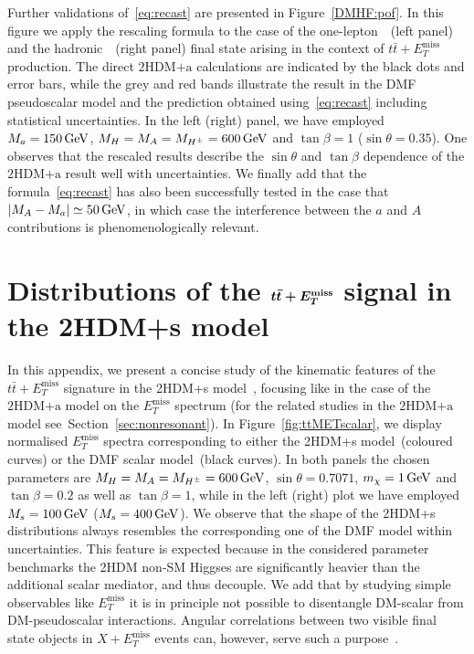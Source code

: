 \documentclass[a4paper, 11pt,notoc]{article}
\newcommand{\MET}{\ensuremath{E_T^\mathrm{miss}}\xspace}
\newcommand{\mA}{\ensuremath{M_{A}}\xspace}
\newcommand{\ma}{\ensuremath{M_{a}}\xspace}
\newcommand{\mH}{\ensuremath{M_{H}}\xspace}
\newcommand{\mHc}{\ensuremath{M_{H^{\pm}}}\xspace}
\newcommand{\hdma}{\ensuremath{\textrm{2HDM+a}}\xspace}
\def\bm#1{\mbox{\boldmath$#1$\unboldmath}}
\begin{document}
Further validations of~\eqref{eq:recast} are presented in Figure~\ref{DMHF:pof}. In this figure we apply the rescaling formula to the case of the  one-lepton~\cite{Aaboud:2017aeu}~(left panel)   and the hadronic~\cite{Aaboud:2017rzf}~(right panel)  final state arising in the context of $t \bar t+\MET$ production. The direct \hdma calculations are indicated by the black dots and error bars, while the grey and red  bands illustrate the result in the DMF pseudoscalar model and the prediction obtained using~\eqref{eq:recast} including statistical uncertainties.  In the left (right) panel, we have employed $\ma = 150 \, {\rm GeV}$, $\mH= \mA = \mHc = 600 \, {\rm GeV}$ and $\tan \beta = 1$ ($\sin\theta=0.35$). One observes that the rescaled results describe the $\sin \theta$ and $\tan \beta$ dependence of the \hdma result well with uncertainties.  We finally add that the formula~\eqref{eq:recast} has also been successfully tested in the case that $|\mA - \ma| \simeq 50 \, {\rm GeV}$, in which case the interference between the $a$ and $A$ contributions is phenomenologically relevant.  


\section{Distributions of the $\bm{t \bar t + \MET}$ signal in the 2HDM+s model}
\label{app:ttMETscalar}

In this appendix, we present a concise study of the kinematic features of the  $t \bar t + \MET$ signature in the 2HDM+s model~\cite{Bell:2016ekl,Bell:2017rgi}, focusing like in the case of the  \hdma model on the $\MET$ spectrum (for the related studies in the \hdma model see~Section~\ref{sec:nonresonant}).  In Figure~\ref{fig:ttMETscalar}, we display normalised $\MET$ spectra corresponding to either  the 2HDM+s model~(coloured curves) or the DMF scalar   model~(black curves). In both panels the chosen parameters are $M_H = M_A = M_{H^\pm} = 600 \, {\rm GeV}$, $\sin \theta = 0.7071$, $m_\chi = 1 \, {\rm GeV}$ and $\tan \beta = 0.2$ as well as $\tan \beta = 1$, while in the left (right) plot we have employed $M_s = 100 \, {\rm GeV}$ ($M_s = 400 \, {\rm GeV}$). We observe that  the shape of the 2HDM+s distributions always  resembles  the corresponding one of the DMF model within uncertainties. This feature is expected because in the considered parameter benchmarks the 2HDM non-SM Higgses are significantly heavier than the additional scalar mediator, and thus decouple. We add that by studying simple observables like $\MET$ it is in principle not possible to disentangle DM-scalar from DM-pseudoscalar interactions. Angular correlations between  two visible final state objects in $X+\MET$ events can, however, serve such a purpose~\cite{Haisch:2016gry,Cotta:2012nj,Haisch:2013fla,Crivellin:2015wva}. 
\end{document}
